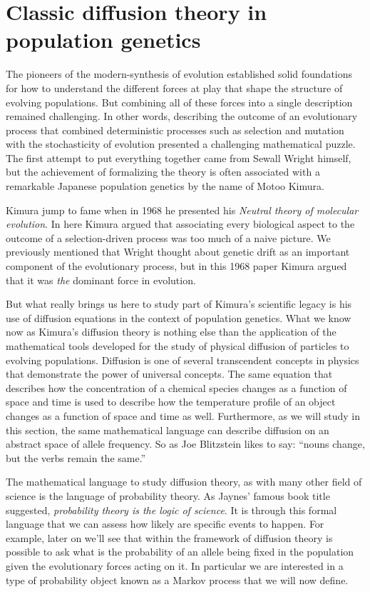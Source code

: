 \section{Classic diffusion theory in population genetics}

The pioneers of the modern-synthesis of evolution established solid foundations
for how to understand the different forces at play that shape the structure of
evolving populations. But combining all of these forces into a single
description remained challenging. In other words, describing the outcome of an
evolutionary process that combined deterministic processes such as selection
and mutation with the stochasticity of evolution presented a challenging
mathematical puzzle. The first attempt to put everything together came from
Sewall Wright himself, but the achievement of formalizing the theory is often
associated with a remarkable Japanese population genetics by the name of Motoo
Kimura.

Kimura jump to fame when in 1968 he presented his \textit{Neutral theory of
molecular evolution}. In here Kimura argued that associating every biological
aspect to the outcome of a selection-driven process was too much of a naive
picture. We previously mentioned that Wright thought about genetic drift as an
important component of the evolutionary process, but in this 1968 paper Kimura
argued that it was \textit{the} dominant force in evolution.

But what really brings us here to study part of Kimura's scientific legacy is
his use of diffusion equations in the context of population genetics. What we
know now as Kimura's diffusion theory is nothing else than the application of
the mathematical tools developed for the study of physical diffusion of
particles to evolving populations. Diffusion is one of several transcendent
concepts in physics that demonstrate the power of universal concepts. The same
equation that describes how the concentration of a chemical species changes as
a function of space and time is used to describe how the temperature profile of
an object changes as a function of space and time as well. Furthermore, as we
will study in this section, the same mathematical language can describe
diffusion on an abstract space of allele frequency. So as Joe Blitzstein likes
to say: ``nouns change, but the verbs remain the same.''

The mathematical language to study diffusion theory, as with many other field
of science is the language of probability theory. As Jaynes' famous book title
suggested, \textit{probability theory is the logic of science}. It is through
this formal language that we can assess how likely are specific events to
happen. For example, later on we'll see that within the framework of diffusion
theory is possible to ask what is the probability of an allele being fixed in
the population given the evolutionary forces acting on it. In particular we are
interested in a type of probability object known as a Markov process that we
will now define.

